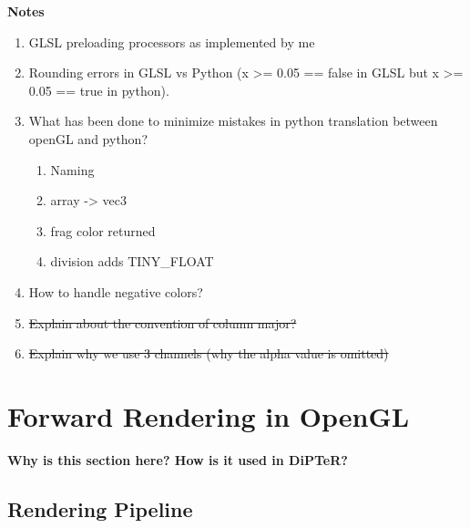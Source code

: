 \textbf{Notes}

\begin{enumerate}
    \item GLSL preloading processors as implemented by me
    \item Rounding errors in GLSL vs Python (x >= 0.05 == false in GLSL but x >= 0.05 == true in python).
    \item What has been done to minimize mistakes in python translation between openGL and python?
    \begin{enumerate}
        \item Naming
        \item array -> vec3
        \item frag color returned
        \item division adds TINY\_FLOAT
    \end{enumerate}
    \item How to handle negative colors?
    \item \st{Explain about the convention of column major? }
    \item \st{Explain why we use 3 channels (why the alpha value is omitted)}
\end{enumerate}

\section{Forward Rendering in OpenGL}\label{sec:RenderingInOpenGL}
\textbf{Why is this section here? How is it used in DiPTeR?}

\subsection{Rendering Pipeline}


